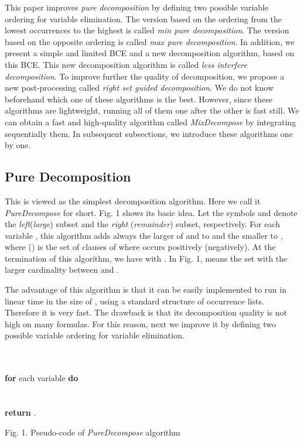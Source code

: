\documentclass{llncs}
\begin{document}
This paper improves \emph{pure decomposition} by defining two
possible variable ordering for variable elimination. The version
based on the ordering from the lowest occurrences to the highest is
called \emph{min pure decomposition}. The version based on the
opposite ordering is called \emph{max pure decomposition}. In
addition, we present a simple and limited BCE and a new
decomposition algorithm, based on this BCE. This new decomposition
algorithm is called \emph{less interfere decomposition}. To improve
further the quality of decomposition, we propose a new
post-processing called \emph{right set guided decomposition}. We do
not know beforehand which one of these algorithms is the best.
However, since these algorithms are lightweight, running all of them
one after the other is fast still. We can obtain a fast and
high-quality algorithm called \emph{MixDecompose} by integrating
sequentially them. In subsequent subsections, we introduce these
algorithms one by one.


\subsection{Pure Decomposition}

This is viewed as the simplest decomposition algorithm. Here we call
it \emph{PureDecompose} for short. Fig. 1 shows its basic idea. Let
the symbols  and  denote the \emph{left}(\emph{large}) subset
and the \emph{right} (\emph{remainder}) subset, respectively. For
each variable , this algorithm adds always the larger of 
and  to  and the smaller to , where 
() is the set of clauses of  where  occurs
positively (negatively). At the termination of this algorithm, we
have  with . In Fig. 1,  means the set with the larger cardinality between
 and .

   The advantage of this algorithm is that it can be easily implemented
to run in linear time in the size of , using a standard structure
of occurrence lists. Therefore it is very fast. The drawback is that
its decomposition quality is not high on many formulas. For this
reason, next we improve it by defining two possible variable
ordering for variable elimination.

\begin{flushleft}
\begin{sf}
\begin{footnotesize}
\hskip 12mm \\
\hskip 16mm \\
\hskip 16mm {\bf for } each variable  {\bf do}\\
\hskip 20mm    \\
\hskip 20mm    \\
\hskip 16mm  {\bf return} .

\vspace{1em}

\hskip 8mm \textrm{Fig. 1. Pseudo-code of \emph{PureDecompose}
algorithm}
\end{footnotesize}
\end{sf}
\end{flushleft}
\end{document}
